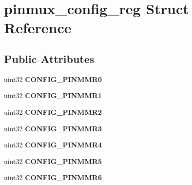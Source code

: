 \hypertarget{structpinmux__config__reg}{}\section{pinmux\+\_\+config\+\_\+reg Struct Reference}
\label{structpinmux__config__reg}
\subsection*{Public Attributes}
\begin{DoxyCompactItemize}
\item 
\mbox{\label{structpinmux__config__reg_a99a96ef92a2c9e91dca570204df917a9}} 
uint32 {\bfseries C\+O\+N\+F\+I\+G\+\_\+\+P\+I\+N\+M\+M\+R0}
\item 
\mbox{\label{structpinmux__config__reg_a18ae4af6fa295bf98390c6558db43567}} 
uint32 {\bfseries C\+O\+N\+F\+I\+G\+\_\+\+P\+I\+N\+M\+M\+R1}
\item 
\mbox{\label{structpinmux__config__reg_a3db13e6b0d18e1f57c5b774fa4b9b159}} 
uint32 {\bfseries C\+O\+N\+F\+I\+G\+\_\+\+P\+I\+N\+M\+M\+R2}
\item 
\mbox{\label{structpinmux__config__reg_a1e414090816eff27a208dfc18322fc3c}} 
uint32 {\bfseries C\+O\+N\+F\+I\+G\+\_\+\+P\+I\+N\+M\+M\+R3}
\item 
\mbox{\label{structpinmux__config__reg_a28a07e6bffe37a44028b1625320fc081}} 
uint32 {\bfseries C\+O\+N\+F\+I\+G\+\_\+\+P\+I\+N\+M\+M\+R4}
\item 
\mbox{\label{structpinmux__config__reg_adcf6dc27df2193325c1bbd9332c0533b}} 
uint32 {\bfseries C\+O\+N\+F\+I\+G\+\_\+\+P\+I\+N\+M\+M\+R5}
\item 
\mbox{\label{structpinmux__config__reg_ac4b54de45ad71e0aede296b12267b19b}} 
uint32 {\bfseries C\+O\+N\+F\+I\+G\+\_\+\+P\+I\+N\+M\+M\+R6}
\item 
\mbox{\label{structpinmux__config__reg_a84e83baf3546757c9d7dfd4b0cb7cdb3}} 

\end{DoxyCompactItemize}
